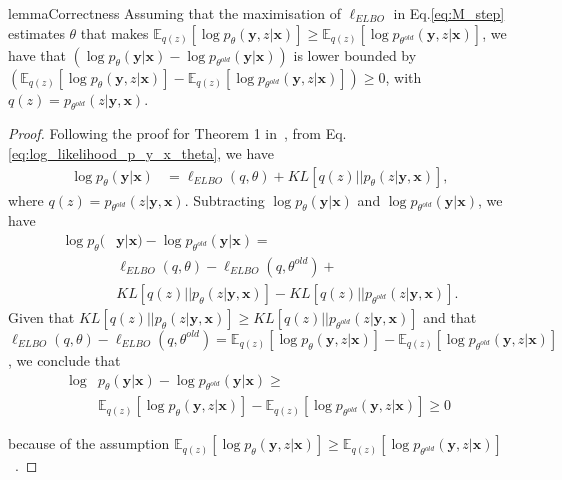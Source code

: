 \documentclass[review]{elsarticle}
\theoremstyle{plain}
\begin{document}
\begin{restatable}[]{lemma}{Correctness}
    \label{thm:correctness}
    Assuming that the maximisation of $\ell_{ELBO}$ in Eq.\ref{eq:M_step} estimates $\theta$ that makes 
    $\mathbb{E}_{q(z)}[\log p_{\theta}(\mathbf{y},z|\mathbf{x})] \ge 
    \mathbb{E}_{q(z)}[\log p_{\theta^{old}}(\mathbf{y},z|\mathbf{x})]$, we have that $\left(\log p_{\theta}(\mathbf{y}|\mathbf{x}) - \log p_{\theta^{old}}(\mathbf{y}|\mathbf{x})\right)$ is lower bounded by $\left(\mathbb{E}_{q(z)}[\log p_{\theta}(\mathbf{y},z|\mathbf{x})] - 
    \mathbb{E}_{q(z)}[\log p_{\theta^{old}}(\mathbf{y},z|\mathbf{x})]\right) \ge 0$, with $q(z)=p_{\theta^{old}}(z|\mathbf{y},\mathbf{x})$.
 \end{restatable}


\begin{proof}
Following the proof for Theorem 1 in~\citep{dempster1977maximum}, from Eq.\ref{eq:log_likelihood_p_y_x_theta}, we have
\begin{equation}
    \begin{split}
         \log p_{\theta}(\mathbf{y}|\mathbf{x})&=\ell_{ELBO}(q,\theta)+KL[q(z)||p_{\theta}(z|\mathbf{y},\mathbf{x})], 
    \end{split}
\end{equation}
where $q(z)=p_{\theta^{old}}(z|\mathbf{y},\mathbf{x})$. Subtracting 
$\log p_{\theta}(\mathbf{y}|\mathbf{x})$ and $\log p_{\theta^{old}}(\mathbf{y}|\mathbf{x})$, we have
\begin{equation}
    \begin{split}
         \log  p_{\theta}(&\mathbf{y}|\mathbf{x}) - \log p_{\theta^{old}}(\mathbf{y}|\mathbf{x}) = \\ 
         & \ell_{ELBO}(q,\theta) - \ell_{ELBO}(q,\theta^{old}) + \\ 
         & KL[q(z)||p_{\theta}(z|\mathbf{y},\mathbf{x})] - KL[q(z)||p_{\theta^{old}}(z|\mathbf{y},\mathbf{x})].
    \end{split}
\end{equation}
Given that $KL[q(z)||p_{\theta}(z|\mathbf{y},\mathbf{x})] \ge KL[q(z)||p_{\theta^{old}}(z|\mathbf{y},\mathbf{x})]$ and that $\ell_{ELBO}(q,\theta) - \ell_{ELBO}(q,\theta^{old}) = 
        \mathbb{E}_{q(z)}[\log p_{\theta}(\mathbf{y},z|\mathbf{x})] - 
    \mathbb{E}_{q(z)}[\log p_{\theta^{old}}(\mathbf{y},z|\mathbf{x})]$, we conclude that
\begin{equation}
\begin{split}
    \log & p_{\theta}(\mathbf{y}|\mathbf{x}) - \log p_{\theta^{old}}  (\mathbf{y}|\mathbf{x})  \ge \\  
    & \mathbb{E}_{q(z)}[\log p_{\theta}(\mathbf{y},z|\mathbf{x})] - 
    \mathbb{E}_{q(z)}[\log p_{\theta^{old}}(\mathbf{y},z|\mathbf{x})] \ge 0
\end{split}    
    \label{eq:difference_bound}
\end{equation}

because of the assumption $\mathbb{E}_{q(z)}[\log p_{\theta}(\mathbf{y},z|\mathbf{x})] \ge 
    \mathbb{E}_{q(z)}[\log p_{\theta^{old}}(\mathbf{y},z|\mathbf{x})]$~\citep{dempster1977maximum}.

\end{proof}
\end{document}
